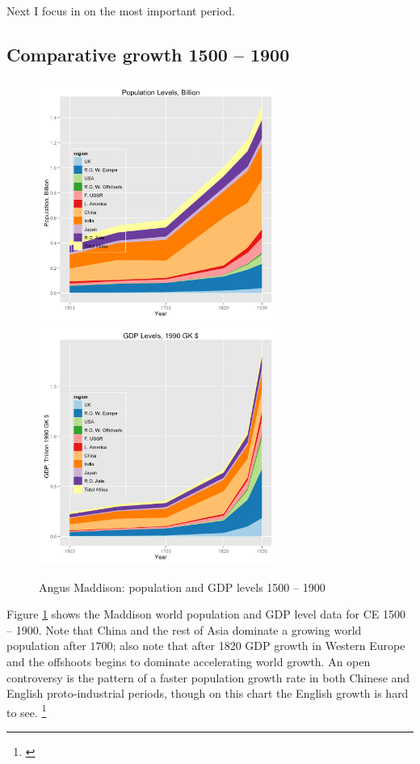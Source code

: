 \documentclass[12pt]{article}
\numberwithin{equation}{section}
\begin{document}
		Next I focus in on the most important period.
		
		\subsection{Comparative growth 1500 -- 1900}		
		
		\begin{figure}[h]
		\centerline{
		\mbox{\includegraphics[width=0.70\textwidth]{maddisonregpoplevels1900.png}}
		\mbox{\includegraphics[width=0.70\textwidth]{maddisonreggdplevels1900.png}}
		}
		\caption{Angus Maddison: population and GDP levels 1500 -- 1900}
		\label{fig:poplevel1900}
		\end{figure}		
		
 				
		Figure \ref{fig:poplevel1900} shows the Maddison world population and GDP level data for CE 1500 -- 1900. Note that China and the rest of Asia dominate a growing world population after $1700$; also note that after 1820 GDP growth in Western Europe and the offshoots begins to dominate accelerating world growth. An open controversy is the pattern of a faster population growth rate in both Chinese and English proto-industrial periods, though on this chart the English growth is hard to see.  \footnote{\citet[p.~22]{pomeranz_great_2001} }
		
\end{document}
